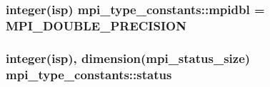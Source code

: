 \subsubsection[{\texorpdfstring{mpidbl}{mpidbl}}]{\setlength{\rightskip}{0pt plus 5cm}integer(isp) mpi\+\_\+type\+\_\+constants\+::mpidbl = M\+P\+I\+\_\+\+D\+O\+U\+B\+L\+E\+\_\+\+P\+R\+E\+C\+I\+S\+I\+ON}\hypertarget{namespacempi__type__constants_a19270446a7b267fa3b13821e93b1744f}{}\label{namespacempi__type__constants_a19270446a7b267fa3b13821e93b1744f}
\subsubsection[{\texorpdfstring{status}{status}}]{\setlength{\rightskip}{0pt plus 5cm}integer(isp), dimension(mpi\+\_\+status\+\_\+size) mpi\+\_\+type\+\_\+constants\+::status}\hypertarget{namespacempi__type__constants_a364a6ee99d8c7ba31bde4f8d2108beaa}{}\label{namespacempi__type__constants_a364a6ee99d8c7ba31bde4f8d2108beaa}
